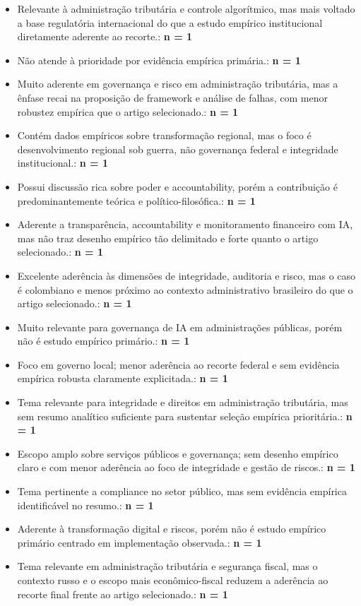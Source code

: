 \documentclass[12pt,a4paper]{article}
\begin{document}
\begin{itemize}
\begin{itemize}
\item Relevante à administração tributária e controle algorítmico, mas mais voltado a base regulatória internacional do que a estudo empírico institucional diretamente aderente ao recorte.: \textbf{n = 1}
\item Não atende à prioridade por evidência empírica primária.: \textbf{n = 1}
\item Muito aderente em governança e risco em administração tributária, mas a ênfase recai na proposição de framework e análise de falhas, com menor robustez empírica que o artigo selecionado.: \textbf{n = 1}
\item Contém dados empíricos sobre transformação regional, mas o foco é desenvolvimento regional sob guerra, não governança federal e integridade institucional.: \textbf{n = 1}
\item Possui discussão rica sobre poder e accountability, porém a contribuição é predominantemente teórica e político-filosófica.: \textbf{n = 1}
\item Aderente a transparência, accountability e monitoramento financeiro com IA, mas não traz desenho empírico tão delimitado e forte quanto o artigo selecionado.: \textbf{n = 1}
\item Excelente aderência às dimensões de integridade, auditoria e risco, mas o caso é colombiano e menos próximo ao contexto administrativo brasileiro do que o artigo selecionado.: \textbf{n = 1}
\item Muito relevante para governança de IA em administrações públicas, porém não é estudo empírico primário.: \textbf{n = 1}
\item Foco em governo local; menor aderência ao recorte federal e sem evidência empírica robusta claramente explicitada.: \textbf{n = 1}
\item Tema relevante para integridade e direitos em administração tributária, mas sem resumo analítico suficiente para sustentar seleção empírica prioritária.: \textbf{n = 1}
\item Escopo amplo sobre serviços públicos e governança; sem desenho empírico claro e com menor aderência ao foco de integridade e gestão de riscos.: \textbf{n = 1}
\item Tema pertinente a compliance no setor público, mas sem evidência empírica identificável no resumo.: \textbf{n = 1}
\item Aderente à transformação digital e riscos, porém não é estudo empírico primário centrado em implementação observada.: \textbf{n = 1}
\item Tema relevante em administração tributária e segurança fiscal, mas o contexto russo e o escopo mais econômico-fiscal reduzem a aderência ao recorte final frente ao artigo selecionado.: \textbf{n = 1}

\end{itemize}
\end{itemize}
\end{document}
